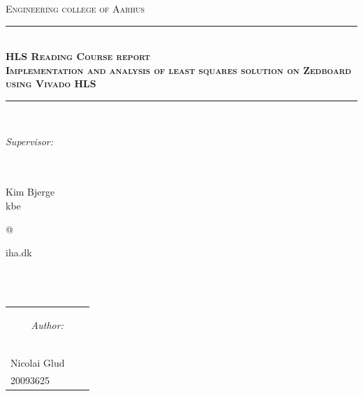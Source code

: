 \newcommand{\HRule}{\rule{\linewidth}{0.5mm}} %

\begin{center} %
 

\textsc{\LARGE Engineering college of Aarhus}\\[1.5cm] %


\HRule \\[0.4cm]
{ \Large \bfseries \textsc{HLS Reading Course report}}\\[0.4cm] %
{ \huge \bfseries \textsc{Implementation and analysis of least squares solution on Zedboard using Vivado HLS}} %
\HRule \\[1.5cm]

\begin{center}
\begin{Large}\textit{Supervisor:}\end{Large}\\
\ \\
Kim Bjerge\\
kbe\begin{Large}@\end{Large}iha.dk
\end{center}
\ \\
\ \\
\begin{table}[H]
\centering
\begin{tabular}{p{4cm} c p{4cm}}
\multicolumn{3}{c}{\begin{Large}\textit{Author:}\end{Large}}\\
\\
\\
\cline{1-1} \cline{3-3}\\
Nicolai Glud &  \\
20093625 
\end{tabular}
\end{table}
\ \\


\end{center}
